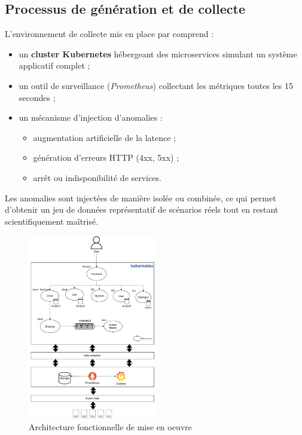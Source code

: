 \documentclass[a4paper,12pt]{report}
\begin{document}
\subsection*{Processus de génération et de collecte}

L’environnement de collecte mis en place par \cite{nobre2023} comprend :
\begin{itemize}
    \item un \textbf{cluster Kubernetes} hébergeant des microservices simulant un système applicatif complet ;
    \item un outil de surveillance (\textit{Prometheus}) collectant les métriques toutes les 15 secondes ;
    \item un mécanisme d’injection d’anomalies :
    \begin{itemize}
        \item augmentation artificielle de la latence ;
        \item génération d’erreurs HTTP (4xx, 5xx) ;
        \item arrêt ou indisponibilité de services.
    \end{itemize}
\end{itemize}

Les anomalies sont injectées de manière isolée ou combinée, ce qui permet d’obtenir un jeu de données représentatif de scénarios réels tout en restant scientifiquement maîtrisé.

\begin{figure}[H]
\centering
\includegraphics[width=0.50\textwidth]{images/general_architure.png}
\caption{Architecture fonctionnelle de mise en oeuvre}
\label{fig:app_achitecture}
\end{figure}
\end{document}
